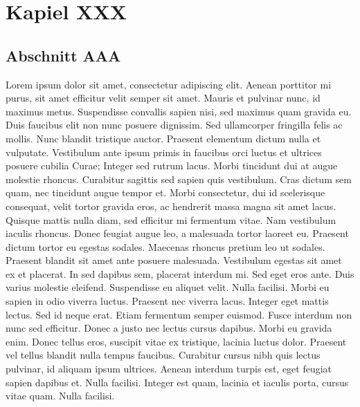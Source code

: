 
\chapter{Kapiel XXX}

\section{Abschnitt AAA}

Lorem ipsum dolor sit amet, consectetur adipiscing elit. Aenean porttitor mi purus, sit amet efficitur velit semper sit amet. Mauris et pulvinar nunc, id maximus metus. Suspendisse convallis sapien nisi, sed maximus quam gravida eu. Duis faucibus elit non nunc posuere dignissim. Sed ullamcorper fringilla felis ac mollis. Nunc blandit tristique auctor. Praesent elementum dictum nulla et vulputate. Vestibulum ante ipsum primis in faucibus orci luctus et ultrices posuere cubilia Curae; Integer sed rutrum lacus. Morbi tincidunt dui at augue molestie rhoncus. Curabitur sagittis sed sapien quis vestibulum. Cras dictum sem quam, nec tincidunt augue tempor et. Morbi consectetur, dui id scelerisque consequat, velit tortor gravida eros, ac hendrerit massa magna sit amet lacus. Quisque mattis nulla diam, sed efficitur mi fermentum vitae. Nam vestibulum iaculis rhoncus.\newpar
Donec feugiat augue leo, a malesuada tortor laoreet eu. Praesent dictum tortor eu egestas sodales. Maecenas rhoncus pretium leo ut sodales. Praesent blandit sit amet ante posuere malesuada. Vestibulum egestas sit amet ex et placerat. In sed dapibus sem, placerat interdum mi. Sed eget eros ante. Duis varius molestie eleifend. Suspendisse eu aliquet velit. Nulla facilisi. Morbi eu sapien in odio viverra luctus.\newpar
Praesent nec viverra lacus. Integer eget mattis lectus. Sed id neque erat. Etiam fermentum semper euismod. Fusce interdum non nunc sed efficitur. Donec a justo nec lectus cursus dapibus. Morbi eu gravida enim. Donec tellus eros, suscipit vitae ex tristique, lacinia luctus dolor. Praesent vel tellus blandit nulla tempus faucibus. Curabitur cursus nibh quis lectus pulvinar, id aliquam ipsum ultrices. Aenean interdum turpis est, eget feugiat sapien dapibus et. Nulla facilisi. Integer est quam, lacinia et iaculis porta, cursus vitae quam. Nulla facilisi.

